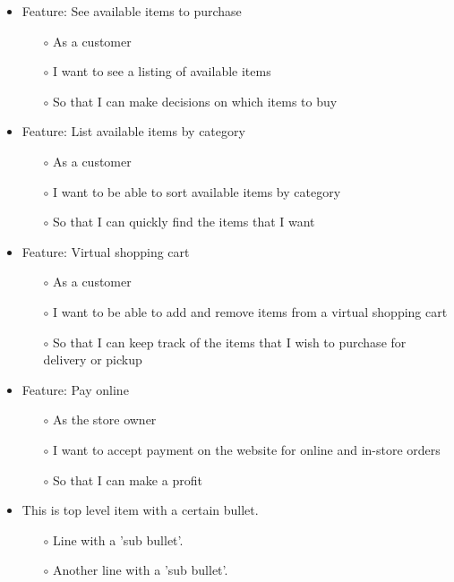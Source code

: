 \documentclass{scrreprt}
\begin{document}
\begin{itemize}
	\item Feature: See available items to purchase
	\begin{itemize}
		\item[$\circ$]As a customer
		\item[$\circ$]I want to see a listing of available items
		\item[$\circ$]So that I can make decisions on which items to buy
	\end{itemize}
\end{itemize}

\begin{itemize}
	\item Feature: List available items by category
	\begin{itemize}
		\item[$\circ$]As a customer
		\item[$\circ$]I want to be able to sort available items by category
		\item[$\circ$]So that I can quickly find the items that I want
	\end{itemize}
\end{itemize}

\begin{itemize}
	\item Feature: Virtual shopping cart
	\begin{itemize}
		\item[$\circ$]As a customer
		\item[$\circ$]I want to be able to add and remove items from a virtual shopping cart
		\item[$\circ$]So that I can keep track of the items that I wish to purchase for delivery or pickup
	\end{itemize}
\end{itemize}

\begin{itemize}
	\item Feature: Pay online
	\begin{itemize}
		\item[$\circ$]As the store owner
		\item[$\circ$]I want to accept payment on the website for online and in-store orders
		\item[$\circ$]So that I can make a profit
	\end{itemize}
\end{itemize}

\begin{itemize}
   \item This is top level item with a certain bullet.
 
   \begin{itemize}
     \item[$\circ$]Line with a 'sub bullet'.
     \item[$\circ$]Another line with a 'sub bullet'.
   \end{itemize}
\end{itemize}
\end{document}
